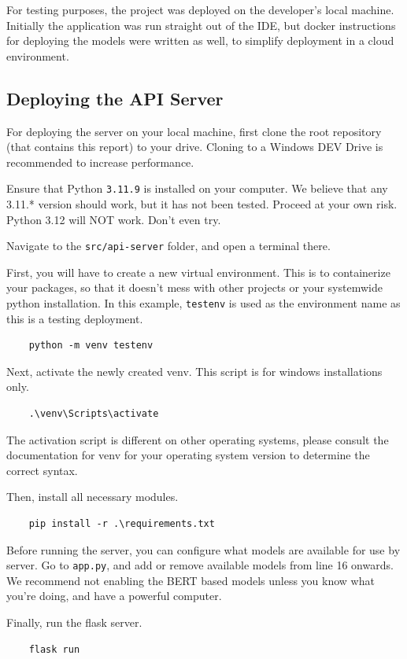 For testing purposes, the project was deployed on the developer's local machine. Initially the application was run straight out of the IDE, but docker instructions for deploying the models were written as well, to simplify deployment in a cloud environment.

\subsection{Deploying the API Server}

For deploying the server on your local machine, first clone the root repository (that contains this report) to your drive. Cloning to a Windows DEV Drive is recommended to increase performance.

Ensure that Python \texttt{3.11.9} is installed on your computer. We believe that any 3.11.* version should work, but it has not been tested. Proceed at your own risk. Python 3.12 will NOT work. Don't even try.

Navigate to the \texttt{src/api-server} folder, and open a terminal there.

First, you will have to create a new virtual environment. This is to containerize your packages, so that it doesn't mess with other projects or your systemwide python installation. In this example, \texttt{testenv} is used as the environment name as this is a testing deployment.
\begin{verbatim}
    python -m venv testenv
\end{verbatim}

Next, activate the newly created venv. This script is for windows installations only.
\begin{verbatim}
    .\venv\Scripts\activate
\end{verbatim}
The activation script is different on other operating systems, please consult the documentation for venv for your operating system version to determine the correct syntax.

Then, install all necessary modules.
\begin{verbatim}
    pip install -r .\requirements.txt
\end{verbatim}

Before running the server, you can configure what models are available for use by server. Go to \texttt{app.py}, and add or remove available models from line 16 onwards. We recommend not enabling the BERT based models unless you know what you're doing, and have a powerful computer.

Finally, run the flask server.
\begin{verbatim}
    flask run
\end{verbatim}

